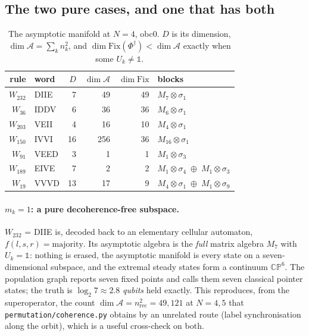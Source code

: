 \documentclass[11pt]{article}
\newcommand{\fn}[1]{\texttt{#1}}
\newcommand{\Phid}{\Phi^{\dagger}}
\theoremstyle{plain}
\theoremstyle{definition}
\theoremstyle{remark}
\begin{document}
\subsection{The two pure cases, and one that has both}

\begin{table}[htbp]
\centering
\caption{The asymptotic manifold at $N = 4$, obc0. $D$ is its dimension,
$\dim\mathcal{A} = \sum_k n_k^2$, and $\dim\mathrm{Fix}(\Phid) < \dim\mathcal{A}$
exactly when some $U_k \neq \mathbb{1}$.}
\label{tab:blocks}
\begin{tabular}{rlrrrl}
\toprule
rule & word & $D$ & $\dim\mathcal{A}$ & $\dim\mathrm{Fix}$ & blocks \\
\midrule
$W_{232}$ & DIIE & 7  & 49  & 49 & $M_7\otimes\sigma_1$ \\
$W_{36}$  & IDDV & 6  & 36  & 36 & $M_6\otimes\sigma_1$ \\
$W_{203}$ & VEII & 4  & 16  & 10 & $M_4\otimes\sigma_1$ \\
$W_{150}$ & IVVI & 16 & 256 & 36 & $M_{16}\otimes\sigma_1$ \\
$W_{91}$  & VEED & 3  & 1   & 1  & $M_1\otimes\sigma_3$ \\
$W_{189}$ & EIVE & 7  & 2   & 2  & $M_1\otimes\sigma_4 \;\oplus\; M_1\otimes\sigma_3$ \\
$W_{19}$  & VVVD & 13 & 17  & 9  & $M_4\otimes\sigma_1 \;\oplus\; M_1\otimes\sigma_9$ \\
\bottomrule
\end{tabular}
\end{table}

\paragraph{$m_k = 1$: a pure decoherence-free subspace.} $W_{232}$ = DIIE is,
decoded back to an elementary cellular automaton, $f(l,s,r) = \mathrm{majority}$.
Its asymptotic algebra is the \emph{full} matrix algebra $M_7$ with $U_k =
\mathbb{1}$: nothing is erased, the asymptotic manifold is every state on a
seven-dimensional subspace, and the extremal steady states form a continuum
$\mathbb{CP}^6$. The population graph reports seven fixed points and calls them
seven classical pointer states; the truth is $\log_2 7 \approx 2.8$
\emph{qubits} held exactly. This reproduces, from the superoperator, the count
$\dim\mathcal{A} = n_{\mathrm{rec}}^2 = 49, 121$ at $N = 4, 5$ that
\fn{permutation/coherence.py} obtains by an unrelated route (label
synchronisation along the orbit), which is a useful cross-check on both.
\end{document}
